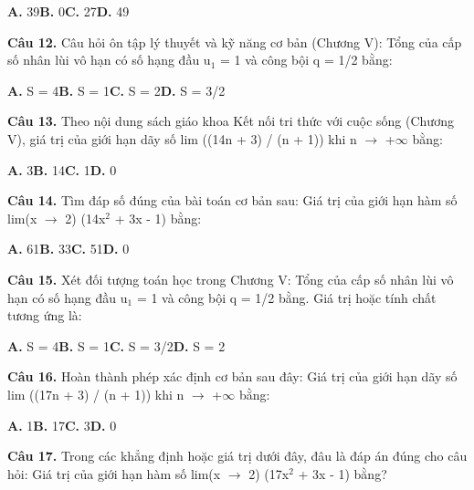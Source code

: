 \documentclass[11pt,a4paper]{article}
\begin{document}
\hspace*{1.5em}\textbf{A.} 39\quad\quad \textbf{B.} 0\quad\quad \textbf{C.} 27\quad\quad \textbf{D.} 49\par\vspace{2pt}
\textbf{\color{primary} Câu 12.} Câu hỏi ôn tập lý thuyết và kỹ năng cơ bản (Chương V): Tổng của cấp số nhân lùi vô hạn có số hạng đầu u$_1$ = 1 và công bội q = 1/2 bằng:\par
\hspace*{1.5em}\textbf{A.} S = 4\quad\quad \textbf{B.} S = 1\quad\quad \textbf{C.} S = 2\quad\quad \textbf{D.} S = 3/2\par\vspace{2pt}
\textbf{\color{primary} Câu 13.} Theo nội dung sách giáo khoa Kết nối tri thức với cuộc sống (Chương V), giá trị của giới hạn dãy số lim ((14n + 3) / (n + 1)) khi n $\to$ +$\infty$ bằng:\par
\hspace*{1.5em}\textbf{A.} 3\quad\quad \textbf{B.} 14\quad\quad \textbf{C.} 1\quad\quad \textbf{D.} 0\par\vspace{2pt}
\textbf{\color{primary} Câu 14.} Tìm đáp số đúng của bài toán cơ bản sau: Giá trị của giới hạn hàm số lim(x $\to$ 2) (14x$^2$ + 3x - 1) bằng:\par
\hspace*{1.5em}\textbf{A.} 61\quad\quad \textbf{B.} 33\quad\quad \textbf{C.} 51\quad\quad \textbf{D.} 0\par\vspace{2pt}
\textbf{\color{primary} Câu 15.} Xét đối tượng toán học trong Chương V: Tổng của cấp số nhân lùi vô hạn có số hạng đầu u$_1$ = 1 và công bội q = 1/2 bằng. Giá trị hoặc tính chất tương ứng là:\par
\hspace*{1.5em}\textbf{A.} S = 4\quad\quad \textbf{B.} S = 1\quad\quad \textbf{C.} S = 3/2\quad\quad \textbf{D.} S = 2\par\vspace{2pt}
\textbf{\color{primary} Câu 16.} Hoàn thành phép xác định cơ bản sau đây: Giá trị của giới hạn dãy số lim ((17n + 3) / (n + 1)) khi n $\to$ +$\infty$ bằng:\par
\hspace*{1.5em}\textbf{A.} 1\quad\quad \textbf{B.} 17\quad\quad \textbf{C.} 3\quad\quad \textbf{D.} 0\par\vspace{2pt}
\textbf{\color{primary} Câu 17.} Trong các khẳng định hoặc giá trị dưới đây, đâu là đáp án đúng cho câu hỏi: Giá trị của giới hạn hàm số lim(x $\to$ 2) (17x$^2$ + 3x - 1) bằng?\par
\end{document}
